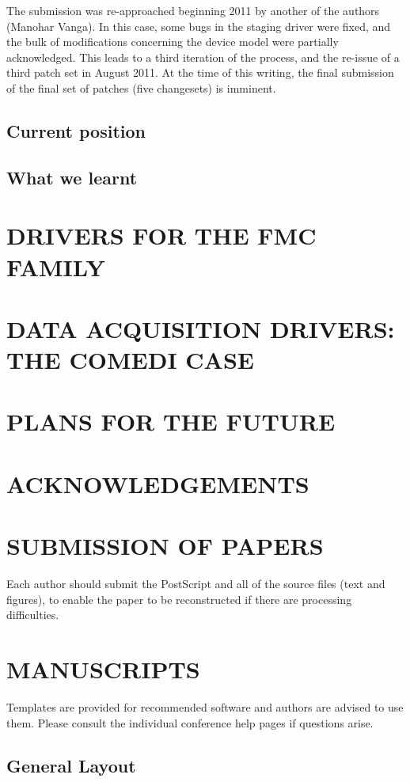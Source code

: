 \documentclass{JAC2003}
\begin{document}
The submission was re-approached beginning 2011 by another of the
authors (Manohar Vanga). In this case, some bugs in the staging driver
were fixed, and the bulk of modifications concerning the device model
were partially acknowledged. This leads to a third iteration of the
process, and the re-issue of a third patch set in August 2011. At the
time of this writing, the final submission of the final set of patches
(five changesets) is imminent.

\subsection{Current position}

\subsection{What we learnt}
\section{DRIVERS FOR THE FMC FAMILY}
\section{DATA ACQUISITION DRIVERS: THE COMEDI CASE}
\section{PLANS FOR THE FUTURE}
\section{ACKNOWLEDGEMENTS}


\section{SUBMISSION OF PAPERS}

Each author should submit the PostScript and all of the source files (text and figures), 
to enable the paper to be reconstructed if there are processing difficulties.

\section{MANUSCRIPTS}

Templates are provided for recommended software and authors are
advised to use them. Please consult the individual conference help pages if questions
arise.

\subsection{General Layout}
\end{document}
